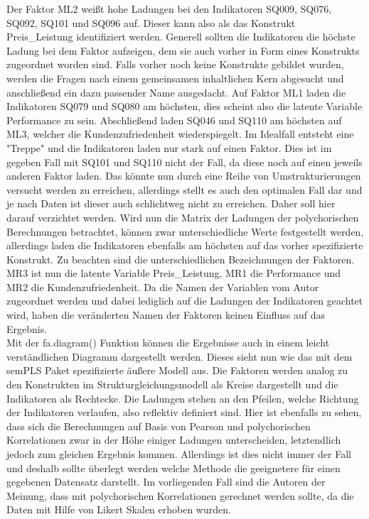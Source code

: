 \documentclass{article}\usepackage[]{graphicx}\usepackage[]{color}
\begin{document}
Der Faktor ML2 weißt hohe Ladungen bei den Indikatoren SQ009, SQ076, SQ092, SQ101 und SQ096 auf. Dieser kann also als das Konstrukt Preis\_Leistung identifiziert werden. Generell sollten die Indikatoren die höchste Ladung bei dem Faktor aufzeigen, dem sie auch vorher in Form eines Konstrukts zugeordnet worden sind. Falls vorher noch keine Konstrukte gebildet wurden, werden die Fragen nach einem gemeinsamen inhaltlichen Kern abgesucht und anschließend ein dazu passender Name ausgedacht. Auf Faktor ML1 laden die Indikatoren SQ079 und SQ080 am höchsten, dies scheint also die latente Variable Performance zu sein. Abschließend laden SQ046 und SQ110 am höchsten auf ML3, welcher die Kundenzufriedenheit wiederspiegelt. Im Idealfall entsteht eine "Treppe" und die Indikatoren laden nur stark auf einen Faktor. Dies ist im gegeben Fall mit SQ101 und SQ110 nicht der Fall, da diese noch auf einen jeweils anderen Faktor laden. Das könnte nun durch eine Reihe von Umstrukturierungen versucht werden zu erreichen, allerdings stellt es auch den optimalen Fall dar und je nach Daten ist dieser auch schlichtweg nicht zu erreichen. Daher soll hier darauf verzichtet werden. Wird nun die Matrix der Ladungen der polychorischen Berechnungen betrachtet, können zwar unterschiedliche Werte festgestellt werden, allerdings laden die Indikatoren ebenfalls am höchsten auf das vorher spezifizierte Konstrukt. Zu beachten sind die unterschiedlichen Bezeichnungen der Faktoren. MR3 ist nun die latente Variable Preis\_Leistung, MR1 die Performance und MR2 die Kundenzufriedenheit. Da die Namen der Variablen vom Autor zugeordnet werden und dabei lediglich auf die Ladungen der Indikatoren geachtet wird, haben die veränderten Namen der Faktoren keinen Einfluss auf das Ergebnis.\\
Mit der fa.diagram() Funktion können die Ergebnisse auch in einem leicht verständlichen Diagramm dargestellt werden. Dieses sieht nun wie das mit dem semPLS Paket spezifizierte äußere Modell aus. Die Faktoren werden analog zu den Konstrukten im Strukturgleichungsmodell als Kreise dargestellt und die Indikatoren als Rechtecke. Die Ladungen stehen an den Pfeilen, welche Richtung der Indikatoren verlaufen, also reflektiv definiert sind. Hier ist ebenfalls zu sehen, dass sich die Berechnungen auf Basis von Pearson und polychorischen Korrelationen zwar in der Höhe einiger Ladungen unterscheiden, letztendlich jedoch zum gleichen Ergebnis kommen. Allerdings ist dies nicht immer der Fall und deshalb sollte überlegt werden welche Methode die geeignetere für einen gegebenen Datensatz darstellt. Im vorliegenden Fall sind die Autoren der Meinung, dass mit polychorischen Korrelationen gerechnet werden sollte, da die Daten mit Hilfe von Likert Skalen erhoben wurden.
\end{document}
